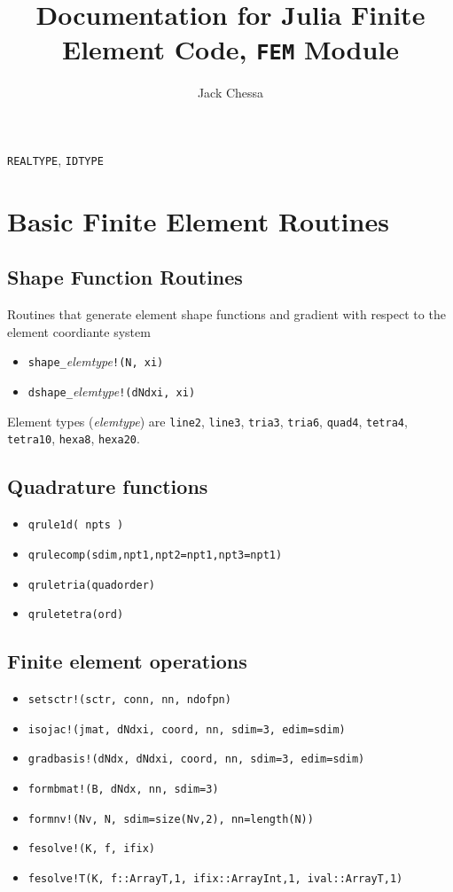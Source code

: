 \documentclass[11pt]{article} %
\title{Documentation for Julia Finite Element Code, \texttt{FEM} Module}
\author{Jack Chessa}
\begin{document}
\maketitle
\texttt{REALTYPE},  \texttt{IDTYPE}

\section{Basic Finite Element Routines}
\subsection{Shape Function Routines}
Routines that generate element shape functions and gradient with respect to the element coordiante system
\begin{itemize}
\item \texttt{shape\_}\textit{elemtype}\texttt{!(N, xi)}
\item \texttt{dshape\_}\textit{elemtype}\texttt{!(dNdxi, xi)}
\end{itemize}
Element types (\textit{elemtype}) are \texttt{line2}, \texttt{line3}, \texttt{tria3}, \texttt{tria6}, \texttt{quad4}, \texttt{tetra4},   \texttt{tetra10}, \texttt{hexa8}, \texttt{hexa20}.

\subsection{Quadrature functions}
\begin{itemize}
\item \texttt{qrule1d( npts )}
\item \texttt{qrulecomp(sdim,npt1,npt2=npt1,npt3=npt1)}
\item \texttt{qruletria(quadorder)}
\item \texttt{qruletetra(ord)}
\end{itemize}

\subsection{Finite element operations}
\begin{itemize}
\item \texttt{setsctr!(sctr, conn, nn, ndofpn)}
\item \texttt{isojac!(jmat, dNdxi, coord, nn, sdim=3, edim=sdim)}
\item \texttt{gradbasis!(dNdx, dNdxi, coord, nn, sdim=3, edim=sdim)}
\item \texttt{formbmat!(B, dNdx, nn, sdim=3)}
\item \texttt{formnv!(Nv, N, sdim=size(Nv,2), nn=length(N))}
\item \texttt{fesolve!(K, f, ifix)}
\item \texttt{fesolve!{T}(K, f::Array{T,1}, ifix::Array{Int,1}, ival::Array{T,1})}
\end{itemize}
\end{document}

